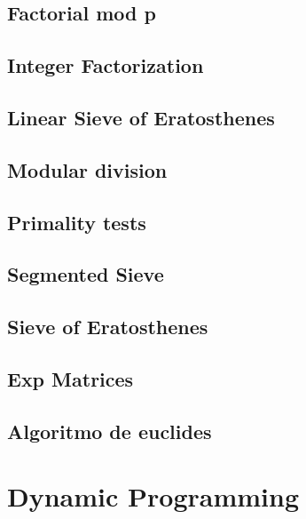 \subsection{Factorial mod p}
\raggedbottom
\hrulefill
\subsection{Integer Factorization}
\raggedbottom
\hrulefill
\subsection{Linear Sieve of Eratosthenes}
\raggedbottom
\hrulefill
\subsection{Modular division}
\raggedbottom
\hrulefill
\subsection{Primality tests}
\raggedbottom
\hrulefill
\subsection{Segmented Sieve}
\raggedbottom
\hrulefill
\subsection{Sieve of Eratosthenes}
\raggedbottom
\hrulefill
\subsection{Exp Matrices}
\raggedbottom
\hrulefill
\subsection{Algoritmo de euclides}
\raggedbottom
\hrulefill

\section{Dynamic Programming}
